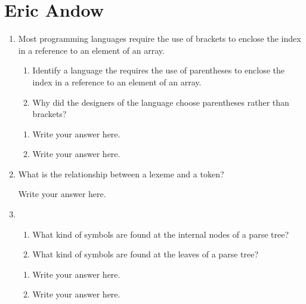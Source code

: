 
\chapter{Eric Andow}

\begin{enumerate}
  \item Most programming languages require the use of brackets to
    enclose the index in a reference to an element of an array.
  \begin{enumerate}
    \item Identify a language the requires the use of parentheses
      to enclose the index in a reference to an element of an array.
    \item Why did the designers of the language choose parentheses
      rather than brackets?
    \end{enumerate}

  \begin{answer}

  \begin{enumerate}
    \item Write your answer here.
    \item Write your answer here.
    \end{enumerate}

    \end{answer}
    
  \item What is the relationship between a lexeme and a token?

  \begin{answer}

    Write your answer here.

    \end{answer}

  \item
  \begin{enumerate}
    \item What kind of symbols are found at the internal nodes of a
      parse tree?
    \item What kind of symbols are found at the leaves of a parse tree?
    \end{enumerate}

  \begin{answer}

  \begin{enumerate}
    \item Write your answer here.
    \item Write your answer here.
    \end{enumerate}


\end{answer}
\end{enumerate}

